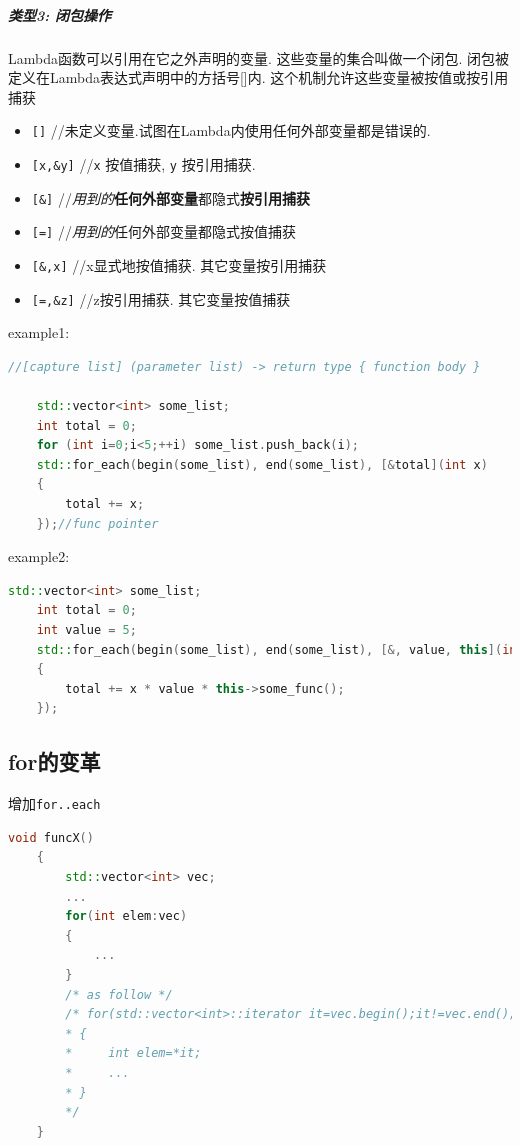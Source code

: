 \documentclass[UTF8,a4paper,12pt]{ctexbook} %
\begin{document}
			\subparagraph{类型3: 闭包操作}Lambda函数可以引用在它之外声明的变量. 这些变量的集合叫做一个闭包. 闭包被定义在Lambda表达式声明中的方括号[]内. 这个机制允许这些变量被按值或按引用捕获
			\begin{itemize}
				\item \verb|[]|  //未定义变量.试图在Lambda内使用任何外部变量都是错误的.
				\item \verb|[x,&y]| //\verb|x| 按值捕获, \verb|y| 按引用捕获.
				\item \verb|[&]|  //\textit{用到的}\textbf{任何外部变量}都隐式\textbf{按引用捕获}
				\item \verb|[=]|  //\textit{用到的}任何外部变量都隐式按值捕获
				\item \verb|[&,x]| //x显式地按值捕获. 其它变量按引用捕获
				\item \verb|[=,&z]| //z按引用捕获. 其它变量按值捕获
			\end{itemize}
			
			example1:
			
			\begin{lstlisting}[language=C++]
	//[capture list] (parameter list) -> return type { function body }
	
	std::vector<int> some_list;
	int total = 0;
	for (int i=0;i<5;++i) some_list.push_back(i);
	std::for_each(begin(some_list), end(some_list), [&total](int x) 
	{
		total += x;
	});//func pointer				
			\end{lstlisting}	
			
			example2:
			
			\begin{lstlisting}[language=C++]
	std::vector<int> some_list;
	int total = 0;
	int value = 5;
	std::for_each(begin(some_list), end(some_list), [&, value, this](int x) 
	{
		total += x * value * this->some_func();
	});			
			\end{lstlisting}
			
		\subsection{for的变革}
			增加\verb|for..each|
			\begin{lstlisting}[language = C++]
	void funcX()
	{
		std::vector<int> vec;
		...
		for(int elem:vec)
		{
			...
		}
		/* as follow */
		/* for(std::vector<int>::iterator it=vec.begin();it!=vec.end();++it)
		* {
		*     int elem=*it;
		*     ...
		* }
		*/
	}		
			\end{lstlisting}
					
\end{document}
